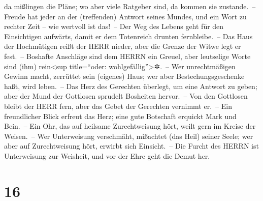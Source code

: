 da mißlingen die Pläne; wo aber viele Ratgeber sind, da kommen sie
zustande.~-- Freude hat jeder an der (treffenden) Antwort
seines Mundes, und ein Wort zu rechter Zeit -- wie wertvoll ist das!~--
Der Weg des Lebens geht für den Einsichtigen aufwärts,
damit er dem Totenreich drunten fernbleibe.~-- Das Haus
der Hochmütigen reißt der HERR nieder, aber die Grenze der Witwe legt er
fest.~-- Boshafte Anschläge sind dem HERRN ein Greuel,
aber leutselige Worte sind (ihm) rein\textless sup title=``oder:
wohlgefällig''\textgreater✲.~-- Wer unrechtmäßigen Gewinn
macht, zerrüttet sein (eigenes) Haus; wer aber Bestechungsgeschenke
haßt, wird leben.~-- Das Herz des Gerechten überlegt, um
eine Antwort zu geben; aber der Mund der Gottlosen sprudelt Bosheiten
hervor.~-- Von den Gottlosen bleibt der HERR fern, aber
das Gebet der Gerechten vernimmt er.~-- Ein freundlicher
Blick erfreut das Herz; eine gute Botschaft erquickt Mark und Bein.~--
Ein Ohr, das auf heilsame Zurechtweisung hört, weilt gern
im Kreise der Weisen.~-- Wer Unterweisung verschmäht,
mißachtet (das Heil) seiner Seele; wer aber auf Zurechtweisung hört,
erwirbt sich Einsicht.~-- Die Furcht des HERRN ist
Unterweisung zur Weisheit, und vor der Ehre geht die Demut her.

\hypertarget{section-15}{%
\section{16}\label{section-15}}

